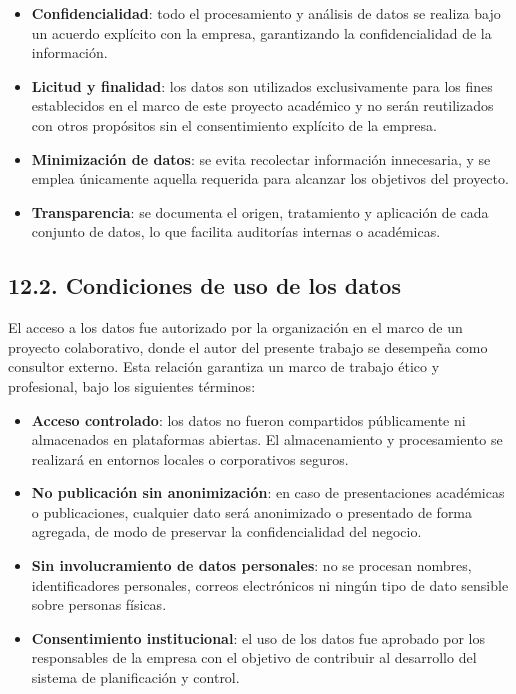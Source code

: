 \documentclass[
11pt, %
]{charter}
\begin{document}
\begin{itemize}
  \item \textbf{Confidencialidad}: todo el procesamiento y análisis de datos se realiza bajo un acuerdo explícito con la empresa, garantizando la confidencialidad de la información.
  \item \textbf{Licitud y finalidad}: los datos son utilizados exclusivamente para los fines establecidos en el marco de este proyecto académico y no serán reutilizados con otros propósitos sin el consentimiento explícito de la empresa.
  \item \textbf{Minimización de datos}: se evita recolectar información innecesaria, y se emplea únicamente aquella requerida para alcanzar los objetivos del proyecto.
  \item \textbf{Transparencia}: se documenta el origen, tratamiento y aplicación de cada conjunto de datos, lo que facilita auditorías internas o académicas.
\end{itemize}

\subsection*{12.2. Condiciones de uso de los datos}

El acceso a los datos fue autorizado por la organización en el marco de un proyecto colaborativo, donde el autor del presente trabajo se desempeña como consultor externo. Esta relación garantiza un marco de trabajo ético y profesional, bajo los siguientes términos:

\begin{itemize}
  \item \textbf{Acceso controlado}: los datos no fueron compartidos públicamente ni almacenados en plataformas abiertas. El almacenamiento y procesamiento se realizará en entornos locales o corporativos seguros.
  \item \textbf{No publicación sin anonimización}: en caso de presentaciones académicas o publicaciones, cualquier dato será anonimizado o presentado de forma agregada, de modo de preservar la confidencialidad del negocio.
  \item \textbf{Sin involucramiento de datos personales}: no se procesan nombres, identificadores personales, correos electrónicos ni ningún tipo de dato sensible sobre personas físicas.
  \item \textbf{Consentimiento institucional}: el uso de los datos fue aprobado por los responsables de la empresa con el objetivo de contribuir al desarrollo del sistema de planificación y control.
\end{itemize}
\end{document}
